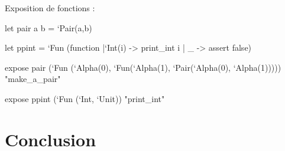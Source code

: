 \documentclass[french,xcolor={usenames,dvipsnames}]{beamer}
\begin{document}
\begin{frame}
  Exposition de fonctions : \\

  \vspace{15pt}

  let pair a b = `Pair(a,b) \\

  \vspace{10pt}

  let ppint = `Fun (function |`Int(i) -> print\_int i | \_ -> assert false) \\

  \vspace{10pt}

  expose pair (`Fun (`Alpha(0), `Fun(`Alpha(1), `Pair(`Alpha(0), `Alpha(1))))) "make\_a\_pair" \\

  \vspace{10pt}

  expose ppint (`Fun (`Int, `Unit)) "print\_int"
\end{frame}

\section{Conclusion}
\end{document}
